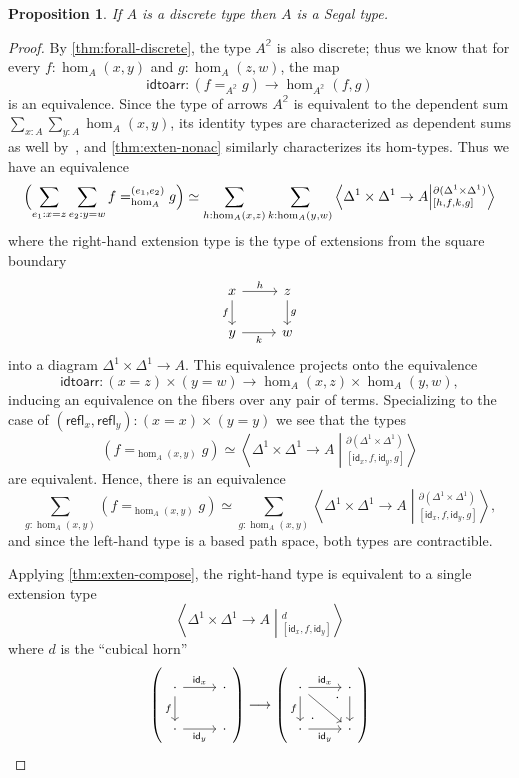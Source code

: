 \documentclass[12pt]{amsart}
\theoremstyle{plain}
\newtheorem{prop}[thm]{Proposition}
\theoremstyle{definition}
\theoremstyle{remark}
\numberwithin{equation}{section}
\newcommand{\ndexten}[4]{\left\langle #1 \to #2 \middle|^{#3}_{#4}\right\rangle}
\newcommand{\refl}{\mathsf{refl}}
\newcommand{\idtoarr}{\mathsf{idtoarr}}
\newcommand{\two}{\mathbb{2}}
\newcommand{\idarr}[1]{\mathsf{id}_{#1}}
\newcommand{\Parens}[1]{\Bigl(#1\Bigr)}
\begin{document}
\begin{prop} If $A$ is a discrete type then $A$ is a Segal type.
\end{prop}
\begin{proof}
By \cref{thm:forall-discrete}, the type $A^\two$ is also discrete; thus we know that for every $f : \hom_A(x,y)$ and $g : \hom_A(z,w)$, the map
\[ \idtoarr : (f =_{A^\two} g) \to \hom_{A^\two}(f,g) \] is an equivalence. Since the type of arrows $A^\two$ is equivalent to the dependent sum $\sum_{x :A} \sum_{y : A} \hom_A(x,y)$, its identity types are characterized as dependent sums as well by~\cite[Theorem 2.7.2]{hottbook}, and \cref{thm:exten-nonac} similarly characterizes its hom-types.
Thus we have an equivalence
\[ \Parens{ \sum_{e_1: x = z} \sum_{e_2 :y = w} f =^{(e_1,e_2)}_{\hom_A} g } \simeq \sum_{h : \hom_A(x,z)} \sum_{k : \hom_A(y,w)} \ndexten{\Delta^1\times\Delta^1}{A}{\partial(\Delta^1\times\Delta^1)}{[h,f,k,g]}\]
where the right-hand extension type is the type of extensions from the square boundary
\[ \begin{tikzcd} x \arrow[d, "f"'] \arrow[r, "h"] & z \arrow[d, "g"] \\ y \arrow[r, "k"'] & w
\end{tikzcd}
\] into a diagram $\Delta^1 \times \Delta^1 \to A$. This equivalence projects onto the equivalence
\[ \idtoarr : (x = z) \times (y = w) \to \hom_A(x,z) \times \hom_A(y,w),\] inducing an equivalence on the fibers over any pair of terms. Specializing to the case of $(\refl_x, \refl_y) : (x =x ) \times (y=y)$ we see that the types
\[ (f =_{\hom_A(x,y)} g ) \simeq  \ndexten{\Delta^1\times\Delta^1}{A}{\partial(\Delta^1\times\Delta^1)}{[\idarr x, f,\idarr y, g]}\] are equivalent. Hence, there is an equivalence
\[  \sum_{g : \hom_A(x,y)} (f =_{\hom_A(x,y)} g ) \simeq  \sum_{g : \hom_A(x,y)} \ndexten{\Delta^1\times\Delta^1}{A}{\partial(\Delta^1\times\Delta^1)}{[\idarr x, f,\idarr y, g]} ,\] and since the left-hand type is a based path space, both types are contractible.

Applying \cref{thm:exten-compose}, the right-hand type is equivalent to a single extension type
\begin{equation}
\ndexten{\Delta^1\times\Delta^1}{A}{d}{[\idarr x, f,\idarr y]} \label{eq:discrete-retract}
\end{equation} 
where $d$ is the ``cubical horn''
  \[
\left( \begin{tikzcd} \cdot \arrow[r, "{\idarr x}"] \arrow[d, "f"'] & \cdot \\ \cdot \arrow[r, "{\idarr y}"'] & \cdot \end{tikzcd} \right) \longrightarrow \left( \begin{tikzcd} \cdot \arrow[r, "{\idarr x}"] \arrow[d, "f"']   \arrow[dr] & \cdot \arrow[d] \arrow[dl, phantom, "\cdot" very near start, "\cdot" very near end] \\ \cdot\arrow[r, "{\idarr y}"']  & \cdot \end{tikzcd} \right)
 \]



\end{proof}
\end{document}

